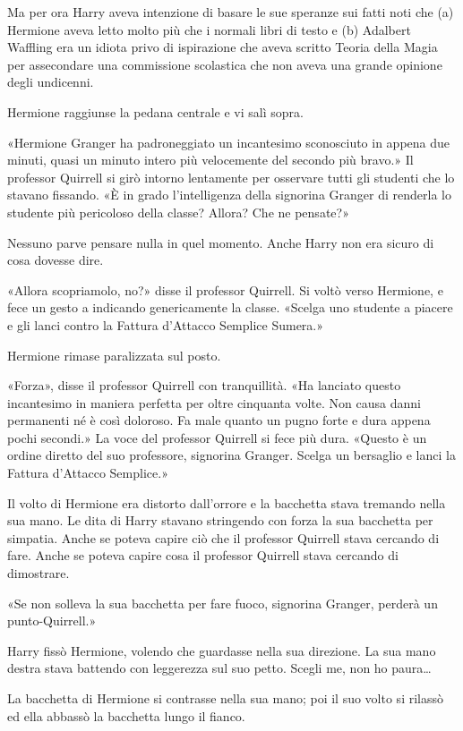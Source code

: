Ma per ora Harry aveva intenzione di basare le sue speranze sui fatti noti che (a) Hermione aveva letto molto più che i normali libri di testo e (b) Adalbert Waffling era un idiota privo di ispirazione che aveva scritto Teoria della Magia per assecondare una commissione scolastica che non aveva una grande opinione degli undicenni.

Hermione raggiunse la pedana centrale e vi salì sopra.

«Hermione Granger ha padroneggiato un incantesimo sconosciuto in appena due minuti, quasi un minuto intero più velocemente del secondo più bravo.» Il professor Quirrell si girò intorno lentamente per osservare tutti gli studenti che lo stavano fissando. «È in grado l’intelligenza della signorina Granger di renderla lo studente più pericoloso della classe? Allora? Che ne pensate?»

Nessuno parve pensare nulla in quel momento. Anche Harry non era sicuro di cosa dovesse dire.

«Allora scopriamolo, no?» disse il professor Quirrell. Si voltò verso Hermione, e fece un gesto a indicando genericamente la classe. «Scelga uno studente a piacere e gli lanci contro la Fattura d’Attacco Semplice Sumera.»

Hermione rimase paralizzata sul posto.

«Forza», disse il professor Quirrell con tranquillità. «Ha lanciato questo incantesimo in maniera perfetta per oltre cinquanta volte. Non causa danni permanenti né è così doloroso. Fa male quanto un pugno forte e dura appena pochi secondi.» La voce del professor Quirrell si fece più dura. «Questo è un ordine diretto del suo professore, signorina Granger. Scelga un bersaglio e lanci la Fattura d’Attacco Semplice.»

Il volto di Hermione era distorto dall’orrore e la bacchetta stava tremando nella sua mano. Le dita di Harry stavano stringendo con forza la sua bacchetta per simpatia. Anche se poteva capire ciò che il professor Quirrell stava cercando di fare. Anche se poteva capire cosa il professor Quirrell stava cercando di dimostrare.

«Se non solleva la sua bacchetta per fare fuoco, signorina Granger, perderà un punto-Quirrell.»

Harry fissò Hermione, volendo che guardasse nella sua direzione. La sua mano destra stava battendo con leggerezza sul suo petto. Scegli me, non ho paura…

La bacchetta di Hermione si contrasse nella sua mano; poi il suo volto si rilassò ed ella abbassò la bacchetta lungo il fianco.

